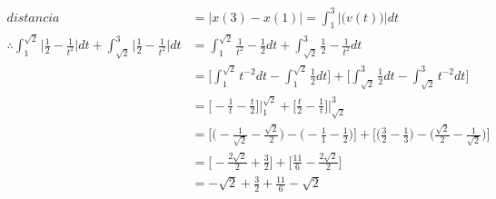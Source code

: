 \begin{align*}
	distancia                                                                                                                        & =\bigg|x(3)-x(1)\bigg|=\int_{1}^{3}\big|\big(v(t)\big)\big|dt                                                                                                                                                      \\
	\therefore \int_{1}^{\sqrt{2}}\bigg|\frac{1}{2}-\frac{1}{t^2}\bigg|dt+\int_{\sqrt{2}}^{3}\bigg|\frac{1}{2}-\frac{1}{t^2}\bigg|dt & =\int_{1}^{\sqrt{2}}\frac{1}{t^2}-\frac{1}{2}dt+\int_{\sqrt{2}}^{3}\frac{1}{2}-\frac{1}{t^2}dt                                                                                                                     \\
	                                                                                                                                 & =\biggl[\int_{1}^{\sqrt{2}}t^{-2}dt-\int_{1}^{\sqrt{2}}\frac{1}{2}dt\biggr]+\biggl[\int_{\sqrt{2}}^{3}\frac{1}{2}dt-\int_{\sqrt{2}}^{3}t^{-2}dt\biggr]                                                             \\
	                                                                                                                                 & =\biggl[-\frac{1}{t}-\frac{t}{2}\biggr]\Bigg|_1^{\sqrt{2}}+\biggl[\frac{t}{2}-\frac{1}{t}\biggr]\Bigg|_{\sqrt{2}}^3                                                                                                \\
	                                                                                                                                 & =\biggl[\Biggl(-\frac{1}{\sqrt{2}}-\frac{\sqrt{2}}{2}\Biggr)-\Biggl(-\frac{1}{1}-\frac{1}{2}\Biggr)\biggr]+\biggl[\Biggl(\frac{3}{2}-\frac{1}{3}\Biggr)-\Biggl(\frac{\sqrt{2}}{2}-\frac{1}{\sqrt{2}}\Biggr)\biggr] \\
	                                                                                                                                 & =\biggl[-\frac{2\sqrt{2}}{2}+\frac{3}{2}\biggr]+\biggl[\frac{11}{6}-\frac{2\sqrt{2}}{2}\biggl]                                                                                                                     \\
	                                                                                                                                 & =-\sqrt{2}+\frac{3}{2}+\frac{11}{6}-\sqrt{2}                                                                                                                                    \\

\end{align*}
